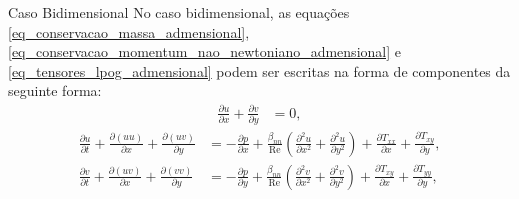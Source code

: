 \begin{frame}{Caso Bidimensional}
No caso bidimensional, as equações \eqref{eq_conservacao_massa_admensional}, \eqref{eq_conservacao_momentum_nao_newtoniano_admensional} e \eqref{eq_tensores_lpog_admensional} podem ser escritas na forma de componentes da seguinte forma:
\begin{align}
    \frac{\partial u}{\partial x}+\frac{\partial v}{\partial y}&=0,\label{eq_cont_bidime}
\end{align}
\begin{subequations}
\begin{align}
    \frac{\partial u}{\partial t}+\frac{\partial(u u)}{\partial x}+\frac{\partial(u v)}{\partial y} &= -\frac{\partial p}{\partial x}+\frac{\beta_{nn}}{\operatorname{Re}}\left(\frac{\partial^2 u}{\partial x^2}+\frac{\partial^2 u}{\partial y^2}\right)+\frac{\partial T_{x x}}{\partial x}+\frac{\partial T_{x y}}{\partial y},\label{eq_movi_x_bidime} \\[7mm]
    \frac{\partial v}{\partial t} + \frac{\partial(u v)}{\partial x} + \frac{\partial(v v)}{\partial y} &= -\frac{\partial p}{\partial y}+\frac{\beta_{nn}}{\operatorname{Re}}\left(\frac{\partial^2 v}{\partial x^2}+\frac{\partial^2 v}{\partial y^2}\right)+\frac{\partial T_{x y}}{\partial x}+\frac{\partial T_{yy}}{\partial y},\label{eq_movi_y_bidime}
\end{align}
\end{subequations}
\end{frame}

